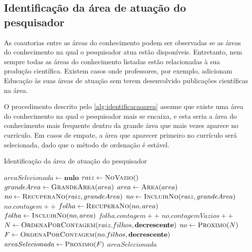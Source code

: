 \subsection{Identificação da área de atuação do pesquisador}

As coautorias entre as áreas do conhecimento podem ser observadas se as áreas do conhecimento na qual o pesquisador atua estão disponíveis. Entretanto, nem sempre todas as áreas do conhecimento listadas estão relacionadas à sua produção científica. Existem casos onde professores, por exemplo, adicionam Educação às suas áreas de atuação sem terem desenvolvido publicações científicas na área.

O procedimento descrito pelo \autoref{alg:identificacaoarea} assume que existe uma área do conhecimento na qual o pesquisador mais se encaixa, e esta seria a área do conhecimento mais frequente dentro da grande área que mais vezes aparece no currículo. Em casos de empate, a área que aparecer primeiro no currículo será selecionada, dado que o método de ordenação é estável.

\begin{algorithm}
\caption{Identificação da área de atuação do pesquisador}
\label{alg:identificacaoarea}
\begin{algorithmic}[1]
    \State $areaSelecionada \gets \textbf{nulo}$
    \State $raiz \gets \Call{NoVazio}$
        \State $grandeArea \gets \Call{GrandeArea}{area}$
        \State $area \gets \Call{Area}{area}$
        \State $no \gets \Call{RecuperaNo}{raiz, grandeArea}$
            \State $no \gets \Call{IncluirNo}{raiz, grandeArea}$
        \EndIf
        \State $no.contagem++$
            \State $folha \gets \Call{RecuperaNo}{no, area}$
                \State $folha \gets \Call{IncluirNo}{no, area}$
            \EndIf
            \State $folha.contagem++$
        \Else
            \State $no.contagemVazios++$
        \EndIf
    \EndFor
    \State $N \gets \Call{OrdenaPorContagem}{raiz.filhos, \textbf{decrescente}}$
        \State $no \gets \Call{Proximo}{N}$
            \State $F \gets \Call{OrdenaPorContagem}{no.filhos, \textbf{decrescente}}$
            \State $areaSelecionada \gets \Call{Proximo}{F}$
        \EndIf
    \EndWhile
    \State \Return $areaSelecionada$
\EndProcedure
\end{algorithmic}
\end{algorithm}

